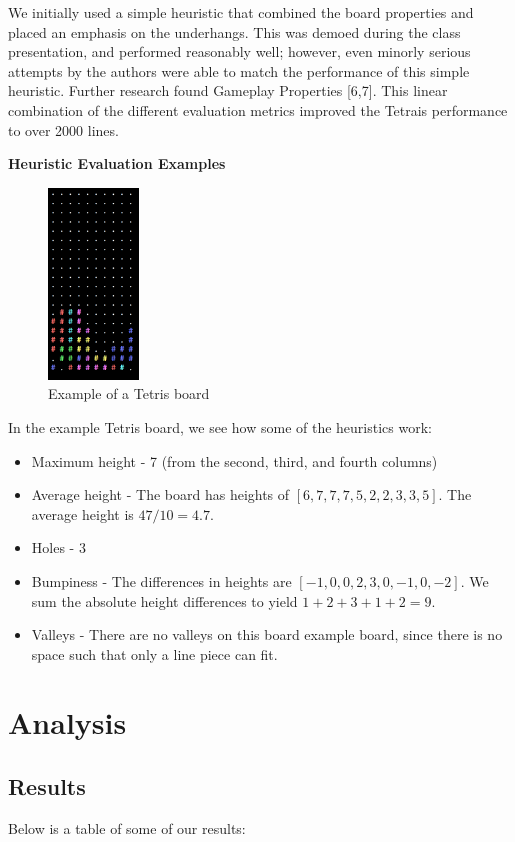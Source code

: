 \documentclass[12pt]{article}
\begin{document}
We initially used a simple heuristic that combined the board properties and placed an emphasis on the underhangs. This was demoed during the class presentation, and performed reasonably well; however, even minorly serious attempts by the authors were able to match the performance of this simple heuristic. Further research found Gameplay Properties [6,7]. This linear combination of the different evaluation metrics improved the Tetrais performance to over 2000 lines.

\textbf{Heuristic Evaluation Examples}

\begin{figure}[h!]
    \centering
\includegraphics[height=2.0in]{bumpiness.png}
\caption{Example of a Tetris board}
\end{figure}

In the example Tetris board, we see how some of the heuristics work:
\begin{itemize}
    \item Maximum height - 7 (from the second, third, and fourth columns)
    \item Average height - The board has heights of $[6, 7, 7, 7, 5, 2, 2, 3, 3, 5]$. The average height is $47 / 10 = 4.7$. 
    \item Holes - 3
    \item Bumpiness -  The differences in heights are $[-1, 0, 0, 2, 3, 0, -1, 0, -2]$. We sum the absolute height differences to yield $1 + 2 + 3 + 1 + 2 = 9$.
    \item Valleys - There are no valleys on this board example board, since there is no space such that only a line piece can fit.
\end{itemize}

\section{Analysis}
\subsection{Results}
Below is a table of some of our results:\vspace{2em}
\end{document}
